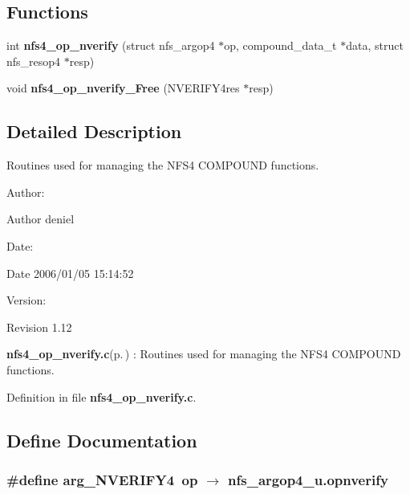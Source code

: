 \subsection*{Functions}
\begin{CompactItemize}
\item 
int {\bf nfs4\_\-op\_\-nverify} (struct nfs\_\-argop4 $\ast$op, compound\_\-data\_\-t $\ast$data, struct nfs\_\-resop4 $\ast$resp)
\item 
void {\bf nfs4\_\-op\_\-nverify\_\-Free} (NVERIFY4res $\ast$resp)
\end{CompactItemize}


\subsection{Detailed Description}
Routines used for managing the NFS4 COMPOUND functions. 

\begin{Desc}
\item[Author:]\begin{Desc}
\item[Author]deniel \end{Desc}
\end{Desc}
\begin{Desc}
\item[Date:]\begin{Desc}
\item[Date]2006/01/05 15:14:52 \end{Desc}
\end{Desc}
\begin{Desc}
\item[Version:]\begin{Desc}
\item[Revision]1.12 \end{Desc}
\end{Desc}
{\bf nfs4\_\-op\_\-nverify.c}{\rm (p.\,\pageref{nfs4__op__nverify_8c})} : Routines used for managing the NFS4 COMPOUND functions.

Definition in file {\bf nfs4\_\-op\_\-nverify.c}.

\subsection{Define Documentation}
\subsubsection{\setlength{\rightskip}{0pt plus 5cm}\#define arg\_\-NVERIFY4\ op $\rightarrow$ nfs\_\-argop4\_\-u.opnverify}\label{nfs4__op__nverify_8c_a0}


